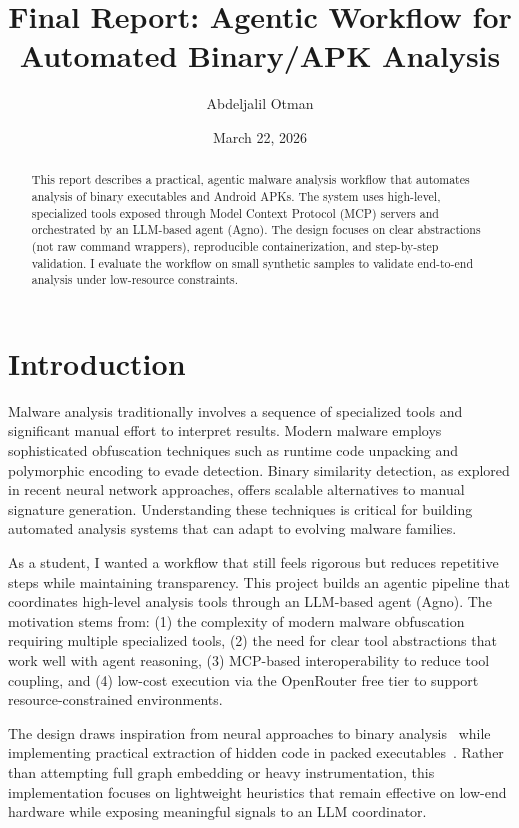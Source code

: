 \documentclass[11pt]{article}
\title{Final Report: Agentic Workflow for Automated Binary/APK Analysis}
\author{Abdeljalil Otman}
\date{March 22, 2026}
\begin{document}
\maketitle

\begin{abstract}
This report describes a practical, agentic malware analysis workflow that automates analysis of binary executables and Android APKs. The system uses high-level, specialized tools exposed through Model Context Protocol (MCP) servers and orchestrated by an LLM-based agent (Agno). The design focuses on clear abstractions (not raw command wrappers), reproducible containerization, and step-by-step validation. I evaluate the workflow on small synthetic samples to validate end-to-end analysis under low-resource constraints.
\end{abstract}

\section{Introduction}
Malware analysis traditionally involves a sequence of specialized tools and significant manual effort to interpret results. Modern malware employs sophisticated obfuscation techniques such as runtime code unpacking and polymorphic encoding to evade detection. Binary similarity detection, as explored in recent neural network approaches, offers scalable alternatives to manual signature generation. Understanding these techniques is critical for building automated analysis systems that can adapt to evolving malware families.

As a student, I wanted a workflow that still feels rigorous but reduces repetitive steps while maintaining transparency. This project builds an agentic pipeline that coordinates high-level analysis tools through an LLM-based agent (Agno). The motivation stems from: (1) the complexity of modern malware obfuscation requiring multiple specialized tools, (2) the need for clear tool abstractions that work well with agent reasoning, (3) MCP-based interoperability to reduce tool coupling, and (4) low-cost execution via the OpenRouter free tier to support resource-constrained environments.

The design draws inspiration from neural approaches to binary analysis~\cite{gemini2018} while implementing practical extraction of hidden code in packed executables~\cite{polyunpack2007}. Rather than attempting full graph embedding or heavy instrumentation, this implementation focuses on lightweight heuristics that remain effective on low-end hardware while exposing meaningful signals to an LLM coordinator.
\end{document}
